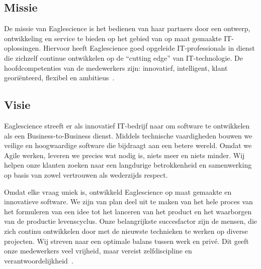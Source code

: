 \subsection{Missie}\label{subsec:missie}

De missie van Eaglescience is het bedienen van haar partners door een ontwerp, ontwikkeling en service te bieden op het gebied van op maat gemaakte IT-oplossingen. Hiervoor heeft Eaglescience goed opgeleide IT-professionals in dienst die zichzelf continue ontwikkelen op de “cutting edge” van IT-technologie. De hoofdcompetenties van de medewerkers zijn: innovatief, intelligent, klant georiënteerd, flexibel en ambitieus~\citep{Eaglescience:2020}.

\subsection{Visie}\label{subsec:visie}
Eaglescience streeft er als innovatief IT-bedrijf naar om software te ontwikkelen als een Business-to-Business dienst. Middels technische vaardigheden bouwen we veilige en hoogwaardige software die bijdraagt aan een betere wereld. Omdat we Agile werken, leveren we precies wat nodig is, niets meer en niets minder. Wij helpen onze klanten zoeken naar een langdurige betrokkenheid en samenwerking op basis van zowel vertrouwen als wederzijds respect.

Omdat elke vraag uniek is, ontwikkeld Eaglescience op maat gemaakte en innovatieve software.  We zijn van plan deel uit te maken van het hele proces van het formuleren van een idee tot het lanceren van het product en het waarborgen van de productie levenscyclus. Onze belangrijkste succesfactor zijn de mensen, die zich continu ontwikkelen door met de nieuwste technieken te werken op diverse projecten. Wij streven naar een optimale balans tussen werk en privé. Dit geeft onze medewerkers veel vrijheid, maar vereist zelfdiscipline en verantwoordelijkheid~\citep{Eaglescience:2020}.

